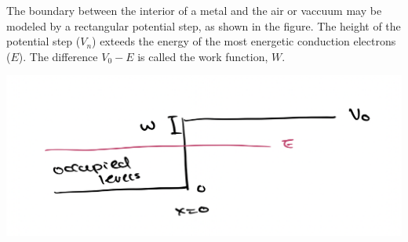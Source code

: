 \documentclass[10pt]{article}
\begin{document}
    The boundary between the interior of a metal and the air or vaccuum may be modeled by a rectangular potential step, as shown in the figure. The height of the potential step ($V_n$) exteeds the energy of the most energetic conduction electrons ($E$). The difference $V_0 - E$ is called the work function, $W$.

    \begin{center}
        \includegraphics[scale=0.5]{potential.png}
    \end{center}
\end{document}

